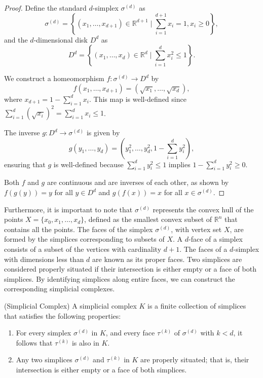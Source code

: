 \begin{proof}
    Define the standard $d$-simplex $\sigma^{(d)}$ as
    \[
        \sigma^{(d)} = \left\{(x_1, \ldots, x_{d+1}) \in \mathbb{R}^{d+1} \mid \sum_{i=1}^{d+1} x_i = 1, x_i \geq 0\right\},
    \]
    and the $d$-dimensional disk $D^{d}$ as
    \[
        D^{d} = \left\{(x_1, \ldots, x_d) \in \mathbb{R}^{d} \mid \sum_{i=1}^{d} x_i^2 \leq 1\right\}.
    \]

    We construct a homeomorphism $f: \sigma^{(d)} \rightarrow D^{d}$ by
    \[
        f(x_1, \ldots, x_{d+1}) = (\sqrt{x_1}, \ldots, \sqrt{x_d}),
    \]
    where $x_{d+1} = 1 - \sum_{i=1}^{d} x_i$. This map is well-defined since $\sum_{i=1}^{d} (\sqrt{x_i})^2 = \sum_{i=1}^{d} x_i \leq 1$.

    The inverse $g: D^{d} \rightarrow \sigma^{(d)}$ is given by
    \[
        g(y_1, \ldots, y_d) = (y_1^2, \ldots, y_d^2, 1 - \sum_{i=1}^{d} y_i^2),
    \]
    ensuring that $g$ is well-defined because $\sum_{i=1}^{d} y_i^2 \leq 1$ implies $1 - \sum_{i=1}^{d} y_i^2 \geq 0$.

    Both $f$ and $g$ are continuous and are inverses of each other, as shown by $f(g(y)) = y$ for all $y \in D^{d}$ and $g(f(x)) = x$ for all $x \in \sigma^{(d)}$.
\end{proof}

Furthermore, it is important to note that $\sigma^{(d)}$ represents the convex hull of the points $X = \{x_0, x_1, \ldots, x_d\}$, defined as the smallest convex subset of $\mathbb{R}^{n}$ that contains all the points. The faces of the simplex $\sigma^{(d)}$, with vertex set $X$, are formed by the simplices corresponding to subsets of $X$. A $d$-face of a simplex consists of a subset of the vertices with cardinality $d+1$. The faces of a $d$-simplex with dimensions less than $d$ are known as its proper faces. Two simplices are considered properly situated if their intersection is either empty or a face of both simplices. By identifying simplices along entire faces, we can construct the corresponding simplicial complexes.

\begin{definition}
	{(Simplicial Complex) \cite[\S 2.2]{boissonnat2018geometric}} \label{simplicialcomplex}
	A simplicial complex $K$ is a finite collection of simplices that satisfies the following properties:
	\begin{enumerate}
		\item For every simplex $\sigma^{(d)}$ in $K$, and every face $\tau^{(k)}$ of $\sigma^{(d)}$ with $k < d$, it follows that $\tau^{(k)}$ is also in $K$.
		\item Any two simplices $\sigma^{(d)}$ and $\tau^{(k)}$ in $K$ are properly situated; that is, their intersection is either empty or a face of both simplices.
	\end{enumerate}
\end{definition}

